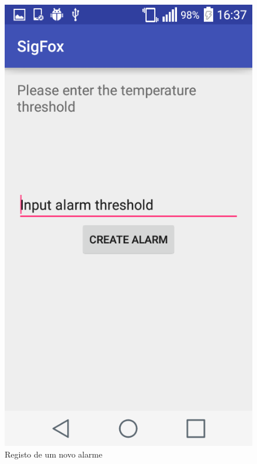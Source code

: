 \documentclass[a4paper]{article}
\begin{document}
\begin{figure}[H]
  \includegraphics[width=\linewidth]{newalarm.png}
  \caption{Registo de um novo alarme}\label{fig:newalarm}
\endminipage\hfill
{}

\end{figure}
\end{document}
